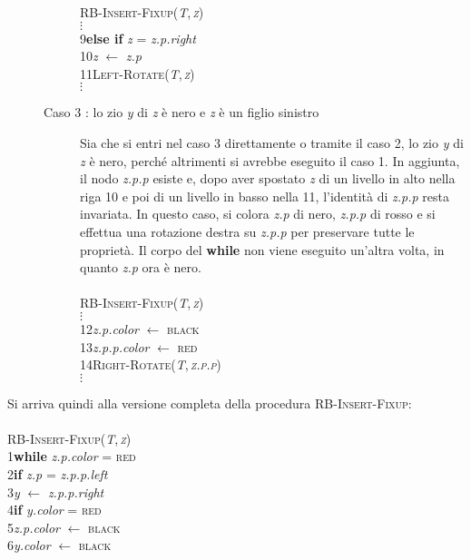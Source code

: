 \documentclass[10pt, a4paper]{report}
\newcommand\firsttab[1][0.5cm]{\hspace*{#1}}
\newcommand\secondtab[1][1cm]{\hspace*{#1}}
\newcommand\thirdtab[1][1.5cm]{\hspace*{#1}}
\newcommand\fourthtab[1][2cm]{\hspace*{#1}}
\newcommand\fifthtab[1][2.5cm]{\hspace*{#1}}
\begin{document}
\begin{description}
\begin{description}
\textsc{RB-Insert-Fixup(\textit{T},\,\textit{z})}\\
$\vdots$\\
9\thirdtab\textbf{else if} \textit{z} = \textit{z.p.right}\\
10\fifthtab\textit{z} $\leftarrow$ \textit{z.p}\\
11\fifthtab\textsc{Left-Rotate(\textit{T},\,\textit{z})}\\
$\vdots$
\item[Caso 3 : lo zio \textit{y} di \textit{z} è nero e \textit{z} è un figlio sinistro]Sia che si entri nel caso 3 direttamente o tramite il caso 2, lo zio \textit{y} di \textit{z} è nero, perché altrimenti si avrebbe eseguito il caso 1. In aggiunta, il nodo \textit{z.p.p} esiste e, dopo aver spostato \textit{z} di un livello in alto nella riga 10 e poi di un livello in basso nella 11, l'identità di \textit{z.p.p} resta invariata. In questo caso, si colora \textit{z.p} di nero, \textit{z.p.p} di rosso e si effettua una rotazione destra su \textit{z.p.p} per preservare tutte le proprietà. Il corpo del \textbf{while} non viene eseguito un'altra volta, in quanto \textit{z.p} ora è nero.\\\\
\textsc{RB-Insert-Fixup(\textit{T},\,\textit{z})}\\
$\vdots$\\
12\fourthtab\textit{z.p.color} $\leftarrow$ \textsc{black}\\
13\fourthtab\textit{z.p.p.color} $\leftarrow$ \textsc{red}\\
14\fourthtab\textsc{Right-Rotate(\textit{T},\,\textit{z.p.p})}\\
$\vdots$
\end{description}
\end{description}
Si arriva quindi alla versione completa della procedura \textsc{RB-Insert-Fixup}:\\\\
\textsc{RB-Insert-Fixup(\textit{T},\,\textit{z})}\\
1\firsttab\textbf{while} \textit{z.p.color} = \textsc{red}\\
2\secondtab\textbf{if} \textit{z.p} = \textit{z.p.p.left}\\
3\thirdtab\textit{y} $\leftarrow$ \textit{z.p.p.right}\\
4\thirdtab\textbf{if} \textit{y.color} = \textsc{red}\\
5\fourthtab\textit{z.p.color} $\leftarrow$ \textsc{black}\\
6\fourthtab\textit{y.color} $\leftarrow$ \textsc{black}\\
\end{document}
